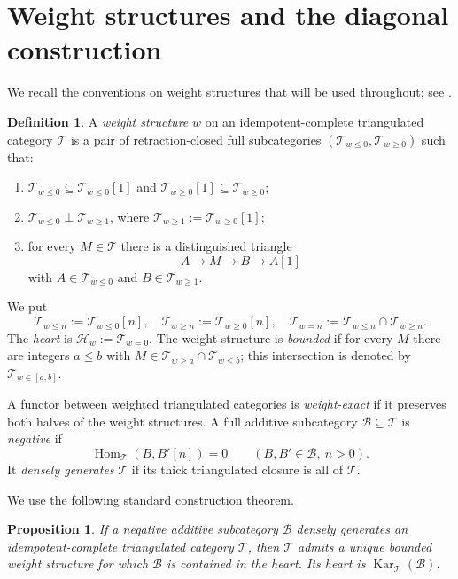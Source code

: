 \documentclass[11pt]{amsart}
\numberwithin{equation}{section}
\newtheorem{proposition}[theorem]{Proposition}
\theoremstyle{definition}
\newtheorem{definition}[theorem]{Definition}
\theoremstyle{remark}
\DeclareMathOperator{\Hom}{Hom}
\DeclareMathOperator{\Kar}{Kar}
\newcommand{\B}{\mathcal B}
\begin{document}
\section{Weight structures and the diagonal construction}\label{sec:weights}

We recall the conventions on weight structures that will be used throughout;
see \cite{BondarkoFoundations}.

\begin{definition}\label{def:weight-structure}
A \emph{weight structure} $w$ on an idempotent-complete triangulated category
$\mathcal T$ is a pair of retraction-closed full subcategories
$(\mathcal T_{w\le0},\mathcal T_{w\ge0})$ such that:
\begin{enumerate}[label=\textup{(\roman*)}]
\item $\mathcal T_{w\le0}\subseteq\mathcal T_{w\le0}[1]$ and
$\mathcal T_{w\ge0}[1]\subseteq\mathcal T_{w\ge0}$;
\item $\mathcal T_{w\le0}\perp\mathcal T_{w\ge1}$, where
$\mathcal T_{w\ge1}:=\mathcal T_{w\ge0}[1]$;
\item for every $M\in\mathcal T$ there is a distinguished triangle
\[
  A\longrightarrow M\longrightarrow B\longrightarrow A[1]
\]
with $A\in\mathcal T_{w\le0}$ and $B\in\mathcal T_{w\ge1}$.
\end{enumerate}
We put
\[
  \mathcal T_{w\le n}:=\mathcal T_{w\le0}[n],
  \quad
  \mathcal T_{w\ge n}:=\mathcal T_{w\ge0}[n],
  \quad
  \mathcal T_{w=n}:=\mathcal T_{w\le n}\cap\mathcal T_{w\ge n}.
\]
The \emph{heart} is
$\mathcal H_w:=\mathcal T_{w=0}$.  The weight structure is \emph{bounded} if
for every $M$ there are integers $a\le b$ with
$M\in\mathcal T_{w\ge a}\cap\mathcal T_{w\le b}$; this intersection is
denoted by $\mathcal T_{w\in[a,b]}$.
\end{definition}

A functor between weighted triangulated categories is \emph{weight-exact} if
it preserves both halves of the weight structures.  A full additive
subcategory $\B\subseteq\mathcal T$ is \emph{negative} if
\[
  \Hom_{\mathcal T}(B,B'[n])=0
  \qquad(B,B'\in\B,\ n>0).
\]
It \emph{densely generates} $\mathcal T$ if its thick 
triangulated closure is all of $\mathcal T$.

We use the following standard construction theorem.

\begin{proposition}
\label{prop:negative-generates}
If a negative additive subcategory $\B$ densely generates an
idempotent-complete triangulated category $\mathcal T$, then $\mathcal T$
admits a unique bounded weight structure for which $\B$ is contained in the
heart.  Its heart is $\Kar_{\mathcal T}(\B)$.
\end{proposition}
\end{document}
